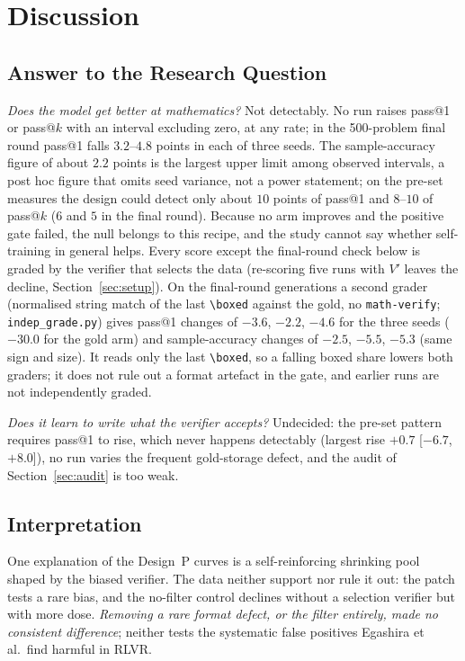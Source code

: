 \documentclass[runningheads]{llncs}
\begin{document}
\section{Discussion}
\label{sec:discussion}

\subsection{Answer to the Research Question}
\label{sec:answer}

\emph{Does the model get better at mathematics?} Not detectably. No run raises
pass@1 or pass@$k$ with an interval excluding zero, at any rate; in the
500-problem final round pass@1 falls $3.2$--$4.8$ points in each of three seeds. The sample-accuracy figure of
about $2.2$ points is the largest upper limit among observed intervals, a post hoc
figure that omits seed variance, not a power statement; on the pre-set measures the design could detect only about $10$ points of pass@1 and
$8$--$10$ of pass@$k$ ($6$ and $5$ in the final round). Because no arm
improves and the positive gate failed, the null belongs to this recipe, and the
study cannot say whether self-training in general helps. Every score except the final-round check below is graded by the verifier that selects
the data (re-scoring five runs with $V'$ leaves the decline, Section~\ref{sec:setup}). On the final-round generations a
second grader (normalised string match of the last \verb|\boxed| against the gold, no \texttt{math-verify};
\texttt{indep\_grade.py}) gives pass@1 changes of $-3.6$, $-2.2$, $-4.6$ for the three seeds ($-30.0$ for the gold arm) and
sample-accuracy changes of $-2.5$, $-5.5$, $-5.3$ (same sign and size). It reads only the last \verb|\boxed|, so a falling boxed share lowers both graders; it does not rule out a format artefact in the gate, and earlier runs are not independently graded.

\emph{Does it learn to write what the verifier accepts?} Undecided: the pre-set pattern requires pass@1 to rise, which never happens
detectably (largest rise $+0.7$ [$-6.7$, $+8.0$]), no run varies the frequent gold-storage defect, and the audit of Section~\ref{sec:audit} is too weak.

\subsection{Interpretation}
\label{sec:threevars}

One explanation of the Design~P curves is a self-reinforcing
shrinking pool shaped by the biased verifier. The data neither support nor rule
it out: the patch tests a rare bias, and the no-filter
control declines without a selection verifier but with more dose. \emph{Removing a rare format defect, or the
filter entirely, made no consistent difference}; neither tests the systematic
false positives Egashira et al.\ find harmful in RLVR.
\end{document}
